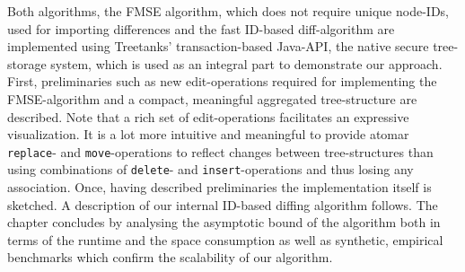 
Both algorithms, the FMSE algorithm, which does not require unique node-IDs, used for importing differences and the fast ID-based diff-algorithm are implemented using Treetanks' transaction-based Java-API, the native secure tree-storage system, which is used as an integral part to demonstrate our approach. First, preliminaries such as new edit-operations required for implementing the FMSE-algorithm and a compact, meaningful aggregated tree-structure are described. Note that a rich set of edit-operations facilitates an expressive visualization. It is a lot more intuitive and meaningful to provide atomar \texttt{replace}- and \texttt{move}-operations to reflect changes between tree-structures than using combinations of \texttt{delete}- and \texttt{insert}-operations and thus losing any association. Once, having described preliminaries the implementation itself is sketched. A description of our internal ID-based diffing algorithm follows. The chapter concludes by analysing the asymptotic bound of the algorithm both in terms of the runtime and the space consumption as well as synthetic, empirical benchmarks which confirm the scalability of our algorithm.



